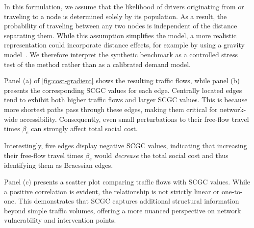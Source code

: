 \documentclass[twocolumn,english,groupedaddress, superscriptaddress,aps,pre,10pt,floatfix]{revtex4-2}
\begin{document}
In this formulation, we assume that the likelihood of drivers originating from or traveling to a node is determined solely by its population. As a result, the probability of traveling between any two nodes is independent of the distance separating them. While this assumption simplifies the model, a more realistic representation could incorporate distance effects, for example by using a gravity model~\cite{wassmer2024resilience}. We therefore interpret the synthetic benchmark as a controlled stress test of the method rather than as a calibrated demand model.


Panel (a) of \cref{fig:cost-gradient} shows the resulting traffic flows, while panel (b) presents the corresponding SCGC values for each edge. Centrally located edges tend to exhibit both higher traffic flows and larger SCGC values. This is because more shortest paths pass through these edges, making them critical for network-wide accessibility. Consequently, even small perturbations to their free-flow travel times $\beta_e$ can strongly affect total social cost.

Interestingly, five edges display negative SCGC values, indicating that increasing their free-flow travel times $\beta_e$ would \emph{decrease} the total social cost and thus identifying them as Braessian edges.

Panel (c) presents a scatter plot comparing traffic flows with SCGC values. While a positive correlation is evident, the relationship is not strictly linear or one-to-one. This demonstrates that SCGC captures additional structural information beyond simple traffic volumes, offering a more nuanced perspective on network vulnerability and intervention points.






\end{document}
